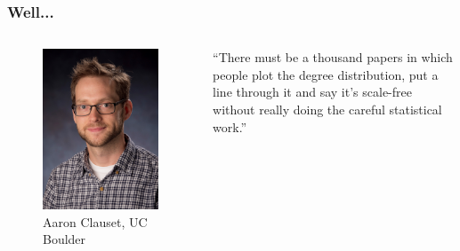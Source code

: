 \documentclass{beamer}
\begin{document}
		\begin{frame}\frametitle{Well...}
			\begin{columns}
				\begin{column}{.35 \textwidth}
					\begin{figure}
						\centering
						\includegraphics[width=.9\textwidth]{AaronClauset_1500}
						\caption{Aaron Clauset, UC Boulder} \label{fig:}
					\end{figure}
				\end{column}
				\begin{column}{.65\textwidth}
					``There must be a thousand papers in which people plot the degree distribution, put a line through it and say it’s scale-free without really doing the careful statistical work.''
				\end{column}
			\end{columns}
		\end{frame}
\end{document}
